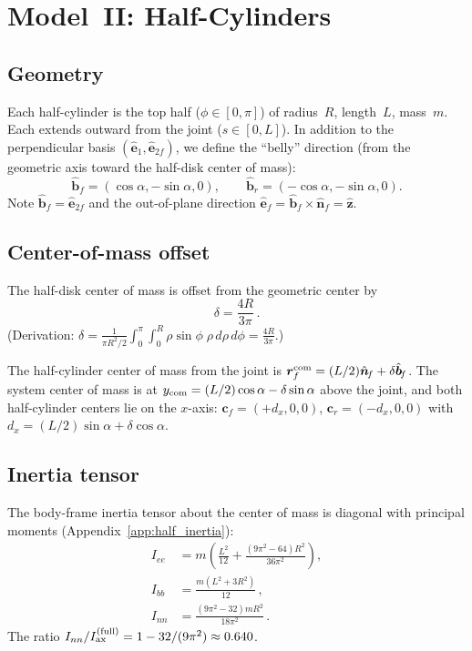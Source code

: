 \documentclass[11pt]{article}
\newcommand{\vect}[1]{\bm{#1}}
\newcommand{\uv}[1]{\hat{\bm{#1}}}
\newcommand{\zhat}{\uv{z}}
\newcommand{\nf}{\uv{n}_{\!f}}
\newcommand{\bfh}{\uv{b}_{\!f}}
\newcommand{\brh}{\uv{b}_{\!r}}
\newcommand{\efh}{\uv{e}_{\!f}}
\begin{document}
\section{Model~II: Half-Cylinders}
\label{sec:half}

\subsection{Geometry}

Each half-cylinder is the top half ($\phi\in[0,\pi]$) of radius~$R$,
length~$L$, mass~$m$.  Each extends outward from the joint ($s\in[0,L]$).
In addition to the perpendicular basis $(\uv{e}_1,\uv{e}_{2f})$, we
define the ``belly'' direction (from the geometric axis toward the
half-disk center of mass):
\begin{equation}
\bfh = (\cos\alpha,-\sin\alpha,0),\qquad
\brh = (-\cos\alpha,-\sin\alpha,0).
\end{equation}
Note $\bfh=\uv{e}_{2f}$ and the out-of-plane direction
$\efh=\bfh\times\nf=\zhat$.

\subsection{Center-of-mass offset}

The half-disk center of mass is offset from the geometric center by
\begin{equation}\label{eq:delta}
\delta = \frac{4R}{3\pi}\,.
\end{equation}
(Derivation: $\delta = \frac{1}{\pi R^2/2}\int_0^\pi\!\int_0^R
\rho\sin\phi\;\rho\,d\rho\,d\phi = \frac{4R}{3\pi}$.)

The half-cylinder center of mass from the joint is
$\vect{r}_f^{\rm com}=(L/2)\nf+\delta\bfh$.  The system center of mass
is at $y_{\rm com}=(L/2)\cos\alpha-\delta\sin\alpha$ above the joint,
and both half-cylinder centers lie on the $x$-axis:
$\vect{c}_f=(+d_x,0,0)$, $\vect{c}_r=(-d_x,0,0)$ with
$d_x=(L/2)\sin\alpha+\delta\cos\alpha$.

\subsection{Inertia tensor}

The body-frame inertia tensor about the center of mass is diagonal with
principal moments (Appendix~\ref{app:half_inertia}):
\begin{align}
I_{ee} &= m\!\left(\frac{L^2}{12}
  +\frac{(9\pi^2-64)R^2}{36\pi^2}\right), \label{eq:Iee}\\
I_{bb} &= \frac{m(L^2+3R^2)}{12}\,, \label{eq:Ibb}\\
I_{nn} &= \frac{(9\pi^2-32)mR^2}{18\pi^2}\,. \label{eq:Inn}
\end{align}
The ratio $I_{nn}/I_{\rm ax}^{(\rm full)}
=1-32/(9\pi^2)\approx0.640$.
\end{document}
